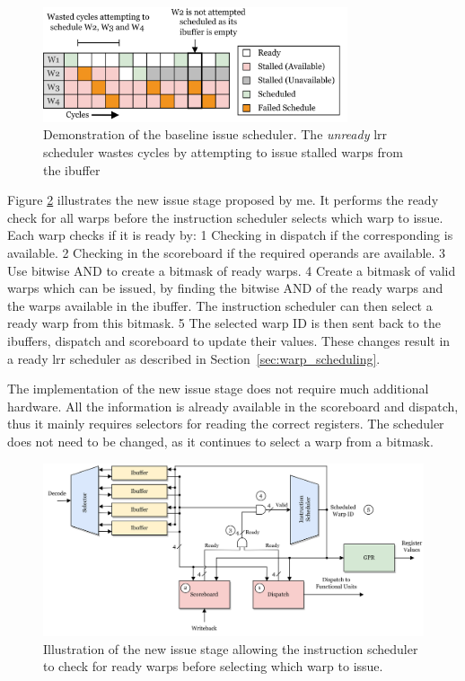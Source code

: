 \begin{figure}
    \centering
    \includegraphics[width=0.8\textwidth]{figures/old_lrr_scheduler.png}
    \caption[Demonstration of the unready baseline issue scheduler]{Demonstration of the baseline issue scheduler. The \textit{unready} \acrshort{lrr} scheduler wastes cycles by attempting to issue stalled warps from the ibuffer}
    \label{fig:unready_lrr}
\end{figure}

Figure \ref{fig:new_issue_stage} illustrates the new issue stage proposed by me. It performs the ready check for all warps before the instruction scheduler selects which warp to issue. Each warp checks if it is ready by: \textcircled{\small{1}} Checking in dispatch if the corresponding  is available. \textcircled{\small{2}} Checking in the scoreboard if the required operands are available. \textcircled{\small{3}} Use bitwise AND to create a bitmask of ready warps. \textcircled{\small{4}} Create a bitmask of valid warps which can be issued, by finding the bitwise AND of the ready warps and the warps available in the ibuffer. The instruction scheduler can then select a ready warp from this bitmask. \textcircled{\small{5}} The selected warp ID is then sent back to the ibuffers, dispatch and scoreboard to update their values. These changes result in a ready \acrfull{lrr} scheduler as described in Section~\ref{sec:warp_scheduling}.

The implementation of the new issue stage does not require much additional hardware. All the information is already available in the scoreboard and dispatch, thus it mainly requires selectors for reading the correct registers. The scheduler does not need to be changed, as it continues to select a warp from a bitmask. 

\begin{figure}
    \centering
    \includegraphics[width=\textwidth]{figures/New Issue Stage.png}
    \caption[Illustration of the new issue stage.]{Illustration of the new issue stage allowing the instruction scheduler to check for ready warps before selecting which warp to issue.}
    \label{fig:new_issue_stage}
\end{figure}

